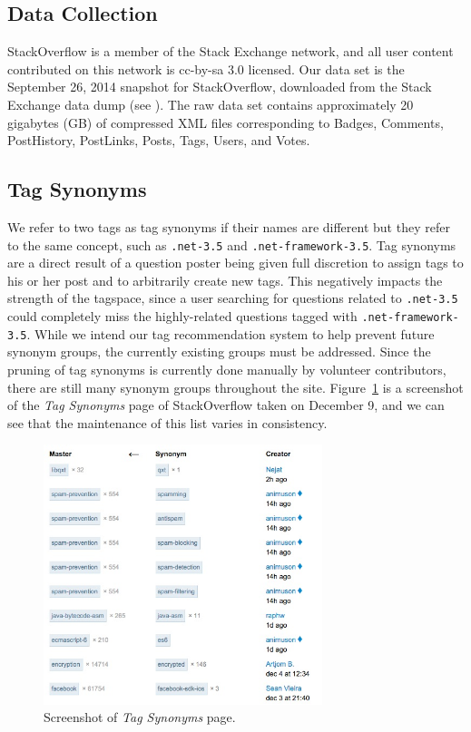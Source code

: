 \documentclass[11pt]{IEEEtran}
\begin{document}
\subsection{Data Collection}

StackOverflow is a member of the Stack Exchange network, and all user content contributed on this network is cc-by-sa 3.0 licensed. Our data set is the September 26, 2014 snapshot for StackOverflow, downloaded from the Stack Exchange data dump (see \cite{6}). The raw data set contains approximately 20 gigabytes (GB) of compressed XML files corresponding to Badges, Comments, PostHistory, PostLinks, Posts, Tags, Users, and Votes.

\subsection{Tag Synonyms}

We refer to two tags as tag synonyms if their names are different but they refer to the same concept, such as \texttt{.net-3.5} and \texttt{.net-framework-3.5}. Tag synonyms are a direct result of a question poster being given full discretion to assign tags to his or her post and to arbitrarily create new tags. This negatively impacts the strength of the tagspace, since a user searching for questions related to \texttt{.net-3.5} could completely miss the highly-related questions tagged with \texttt{.net-framework-3.5}. While we intend our tag recommendation system to help prevent future synonym groups, the currently existing groups must be addressed.  Since the pruning of tag synonyms is currently done manually by volunteer contributors, there are still many synonym groups throughout the site. Figure~\ref{fig:syn} is a screenshot of the \textit{Tag Synonyms} page of StackOverflow taken on December 9, and we can see that the maintenance of this list varies in consistency.\\

\begin{figure}[h]
  \centering
    \includegraphics[width=3.2in]{tagsynonyms_so.jpg}
  \caption{Screenshot of \textit{Tag Synonyms} page.}
  \label{fig:syn}
\end{figure}
\end{document}
